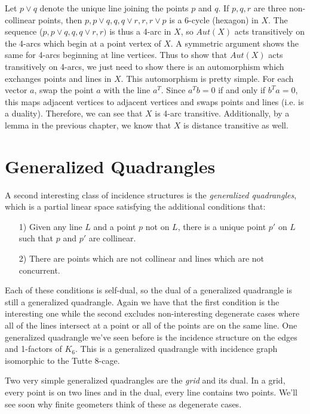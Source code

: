 Let $p\lor q$ denote the unique line joining the points $p$ and $q$.  If $p,q,r$ are three non-collinear points, then $p,p\lor q,q,q\lor r, r, r\lor p$ is a 6-cycle (hexagon) in $X$.  The sequence ($p,p\lor q,q,q\lor r, r)$ is thus a 4-arc in $X$, so $Aut(X)$ acts transitively on the 4-arcs which begin at a point vertex of $X$.  A symmetric argument shows the same for 4-arcs beginning at line vertices.  Thus to show that $Aut(X)$ acts transitively on 4-arcs, we just need to show there is an automorphism which exchanges points and lines in $X$.  This automorphism is pretty simple.  For each vector $a$, swap the point $a$ with the line $a^T$.  Since $a^Tb=0$ if and only if $b^Ta=0$, this maps adjacent vertices to adjacent vertices and swaps points and lines (i.e. is a duality).  Therefore, we can see that $X$ is 4-arc transitive.  Additionally, by a lemma in the previous chapter, we know that $X$ is distance transitive as well.


\section*{Generalized Quadrangles}
A second interesting class of incidence structures is the \textit{generalized quadrangles}, which is a partial linear space satisfying the additional conditions that:
\begin{enumerate}
	\item[1)] Given any line $L$ and a point $p$ not on $L$, there is a unique point $p'$ on $L$ such that $p$ and $p'$ are collinear.
	\item[2)] There are points which are not collinear and lines which are not concurrent.
\end{enumerate}
Each of these conditions is self-dual, so the dual of a generalized quadrangle is still a generalized quadrangle.  Again we have that the first condition is the interesting one while the second excludes non-interesting degenerate cases where all of the lines intersect at a point or all of the points are on the same line.  One generalized quadrangle we've seen before is the incidence structure on the edges and 1-factors of $K_6$.  This is a generalized quadrangle with incidence graph isomorphic to the Tutte 8-cage.

Two very simple generalized quadrangles are the \textit{grid} and its dual.  In a grid, every point is on two lines and in the dual, every line contains two points.  We'll see soon why finite geometers think of these as degenerate cases.

